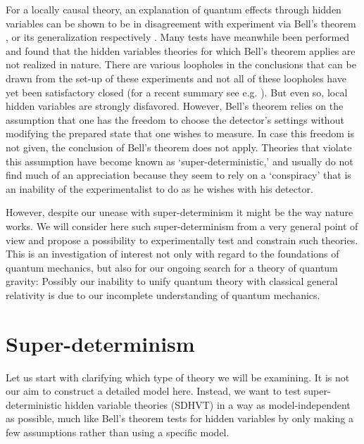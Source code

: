 \documentclass[12pt]{article}                    %
\begin{document}
For a locally causal theory, an explanation of quantum effects through 
hidden variables can be shown to be in disagreement with experiment 
via Bell's theorem \cite{Bell:1964kc}, or its generalization respectively \cite{Clauser:1969ny}. 
Many tests \cite{Aspect:1982fx,Weihs:1998gy,Tittel:1998ja,Rowe,Moehring,Ansmann,Hasegawa} have meanwhile 
been performed and found that the hidden variables theories
for which Bell's theorem applies are not realized in nature. There are various loopholes
in the conclusions that can be drawn from the set-up of these experiments and not all of these
loopholes have yet been satisfactory closed (for a recent summary see e.g. \cite{loop}). But even so,
local hidden variables are strongly disfavored. However, Bell's theorem relies 
on the assumption that one has the freedom to choose the detector's settings without modifying the 
prepared state that one wishes to measure. In case this freedom is not given, the
conclusion of Bell's theorem does not apply. Theories that violate this assumption have become known 
as `super-deterministic,' and usually do not find much of an appreciation 
because they seem to rely on a `conspiracy' that is an inability of the
experimentalist to do as he wishes with his detector. 

However, despite our unease with super-determinism it might be 
the way nature works. We will consider here such super-determinism
from a very general point of view and propose a possibility to experimentally test and constrain
such theories. This is an investigation of interest not only with regard to the foundations 
of quantum mechanics, but also for our ongoing search for a theory of quantum
gravity: Possibly our inability to unify quantum theory with classical
general relativity is due to our incomplete understanding of quantum mechanics.

\section{Super-determinism}

Let us start with clarifying which type of theory we will be examining. It is
not our aim to construct a detailed model here. Instead, we want to test 
super-deterministic hidden variable theories ({\sc SDHVT}) in a way as model-independent as possible, much like Bell's theorem
tests for hidden variables by only making a few assumptions rather than using
a specific model.
\end{document}
